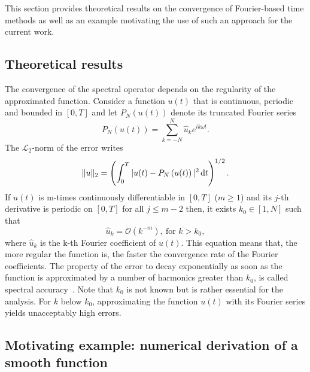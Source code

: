 
This section provides theoretical results on the
convergence of Fourier-based time methods as well
as an example motivating the use of such an approach
for the current work.

\subsection{Theoretical results}
\label{sub:spectral_accuracy}

The convergence of the spectral operator depends on
the regularity of the approximated function. Consider a function
$u(t)$ that is continuous, periodic and bounded in $[0,T]$
and let $P_N \left(u(t)\right)$ denote its truncated Fourier series
\begin{equation}
    P_N \left(u(t)\right) = \sum_{k=-N}^{N} \widehat{u}_k e^{i k\omega t}.
\end{equation}
The $\mathcal{L}_2$-norm of the error writes
\begin{equation}
   \| u \|_2 = \left(\int_0^T |u(t) - P_N \left(u(t)\right)|^2 \mathop{}\!\mathrm{d} t \right)^{1/2}.
\end{equation}
If $u(t)$ is m-times continuously differentiable in $[0,T]$ ($m \geq 1$) 
and its $j$-th derivative is periodic on $[0,T]$ for all $j \leq m - 2$
then, it exists  $k_0 \in [1, N]$ such that
\begin{equation}
    \widehat{u}_k = \mathcal{O} (k^{-m}),~\textrm{for } k > k_0,
\end{equation}
where $\widehat{u}_k$ is the k-th Fourier coefficient of $u(t)$.
This equation means that, the more regular the function is,
the faster the convergence rate of the Fourier
coefficients.
The property of the error to decay exponentially as soon as 
the function is approximated by a number of harmonics greater than $k_0$, 
is called spectral accuracy~\cite{Canuto2006}. Note that
$k_0$ is not known but is rather essential for the analysis.
For $k$ below $k_0$, approximating the function $u(t)$ with its Fourier
series yields unacceptably high errors.

\subsection{Motivating example: numerical derivation of a smooth function}
\label{sec:hb_operator}

